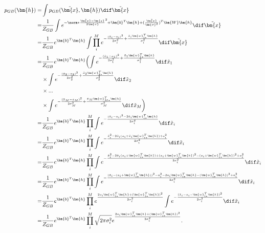 \begin{align}
	p_{GB} (\bm{h}) =& \int p_{GB} (\tilde{\bm{x}}, \bm{h}) \dif \tilde{\bm{x}} \nonumber \\
	=& \frac{1}{Z_{GB}} \int e^{-\norm*{\frac{\tilde{\bm{x}} -\bm{a}}{2\bm{\sigma}}}^2 + \bm{b}^T \bm{h} 
	+ (\frac{\tilde{\bm{x}}}{\bm{\sigma}^2})^T \bm{W}\bm{h}} \dif \tilde{\bm{x}} \nonumber \\
	=& \frac{1}{Z_{GB}} e^{\bm{b}^T \bm{h} } \int \prod_i^M
	e^{- \frac{(\tilde{x}_i - a_i)^2}{2\sigma_i^2} + \frac{\tilde{x}_i \bm{w}_{i\ast}^T \bm{h}}{\sigma_i^2} } \dif \tilde{\bm{x}} \nonumber \\
	=& \frac{1}{Z_{GB}} e^{\bm{b}^T \bm{h} }
	\biggl( \int e^{- \frac{(\tilde{x}_1 - a_1)^2}{2\sigma_1^2} + \frac{\tilde{x}_1 \bm{w}_{1\ast}^T \bm{h}}{\sigma_1^2} } \dif \tilde{x}_1 \nonumber \\
	& \times \int e^{- \frac{(\tilde{x}_2 - a_2)^2}{2\sigma_2^2} + \frac{\tilde{x}_2 \bm{w}_{2\ast}^T \bm{h}}{\sigma_2^2} } \dif \tilde{x}_2 \nonumber \\
	& \times ... \nonumber \\
	&\times \int e^{- \frac{(\tilde{x}_M - a_M)^2}{2\sigma_M^2} + \frac{\tilde{x}_M \bm{w}_{M\ast}^T \bm{h}}{\sigma_M^2} } \dif \tilde{x}_M \biggr) \nonumber \\
	=& \frac{1}{Z_{GB}} e^{\bm{b}^T \bm{h}} \prod_i^M
	\int e^{- \frac{(\tilde{x}_i - a_i)^2 - 2\tilde{x}_i \bm{w}_{i\ast}^T \bm{h}}{2\sigma_i^2} } \dif \tilde{x}_i \nonumber \\
	=& \frac{1}{Z_{GB}} e^{\bm{b}^T \bm{h}} \prod_i^M
	\int e^{- \frac{\tilde{x}_i^2 - 2\tilde{x}_i(a_i + \tilde{x}_i \bm{w}_{i\ast}^T \bm{h}) + a_i^2}{2\sigma_i^2} } \dif \tilde{x}_i \nonumber \\
	=& \frac{1}{Z_{GB}} e^{\bm{b}^T \bm{h}} \prod_i^M
	\int e^{- \frac{\tilde{x}_i^2 - 2\tilde{x}_i(a_i + \bm{w}_{i\ast}^T \bm{h}) + (a_i + \bm{w}_{i\ast}^T \bm{h})^2 - (a_i + \bm{w}_{i\ast}^T \bm{h})^2 + a_i^2}{2\sigma_i^2} } \dif \tilde{x}_i \nonumber \\
	=& \frac{1}{Z_{GB}} e^{\bm{b}^T \bm{h}} \prod_i^M
	\int e^{- \frac{(\tilde{x}_i - (a_i + \bm{w}_{i\ast}^T \bm{h}))^2 - a_i^2 -2a_i \bm{w}_{i\ast}^T \bm{h} - (\bm{w}_{i\ast}^T \bm{h})^2 + a_i^2}{2\sigma_i^2} } \dif \tilde{x}_i \nonumber \\
	=& \frac{1}{Z_{GB}} e^{\bm{b}^T \bm{h}} \prod_i^M
	e^{\frac{2a_i \bm{w}_{i\ast}^T \bm{h} +(\bm{w}_{i\ast}^T \bm{h})^2 }{2\sigma_i^2}}
	\int e^{- \frac{(\tilde{x}_i - a_i - \bm{w}_{i\ast}^T \bm{h})^2}{2\sigma_i^2}}
	\dif \tilde{x}_i \nonumber \\
	=& \frac{1}{Z_{GB}} e^{\bm{b}^T \bm{h}} \prod_i^M
	\sqrt{2\pi \sigma_i^2}
	e^{\frac{2a_i \bm{w}_{i\ast}^T \bm{h} +(\bm{w}_{i\ast}^T \bm{h})^2 }{2\sigma_i^2}} .
\end{align}

